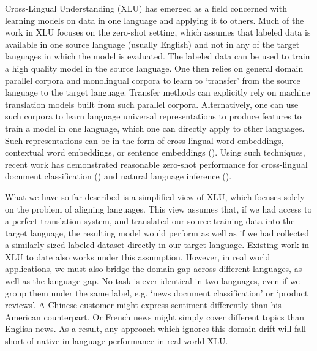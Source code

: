 \documentclass{article} \usepackage{iclr2020_conference,times}
\begin{document}
Cross-Lingual Understanding (XLU) has emerged as a field concerned with learning models on data in one language and applying it to others. 
Much of the work in XLU focuses on the zero-shot setting, which assumes that labeled data is available in one source language (usually English) and not in any of the target languages in which the model is evaluated. 
The labeled data can be used to train a high quality model in the source language.  
One then relies on general domain parallel corpora and monolingual corpora to learn to `transfer' from the source language to the target language.  
Transfer methods can explicitly rely on machine translation models built from such parallel corpora.  
Alternatively, one can use such corpora to learn language universal representations to produce features to train a model in one language, which one can directly apply to other languages.  
Such representations can be in the form of cross-lingual word embeddings, contextual word embeddings, or sentence embeddings (\cite{ruder2017survey, lample2019cross, schwenk2017learning}).  
Using such techniques, recent work has demonstrated reasonable zero-shot performance for cross-lingual document classification (\cite{schwenk2018corpus}) and natural language inference (\cite{conneau2018xnli}). 

What we have so far described is a simplified view of XLU, which focuses solely on the problem of aligning languages.  
This view assumes that, if we had access to a perfect translation system, and translated our source training data into the target language, the resulting model would perform as well as if we had collected a similarly sized labeled dataset directly in our target language. 
Existing work in XLU to date also works under this assumption.  
However, in real world applications, we must also bridge the domain gap across different languages, as well as the language gap.  
No task is ever identical in two languages, even if we group them under the same label, e.g. `news document classification' or `product reviews'.  
A Chinese customer might express sentiment differently than his American counterpart.  
Or French news might simply cover different topics than English news.  
As a result, any approach which ignores this domain drift will fall short of native in-language performance in real world XLU.
\end{document}
